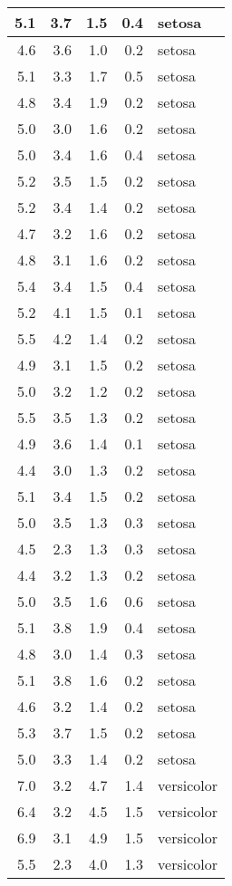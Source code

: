 \documentclass[a4paper, 10pt]{article}\usepackage[]{graphicx}\usepackage[]{color}
\begin{document}
\begin{longtable}{r|r|r|r|l}
5.1 & 3.7 & 1.5 & 0.4 & setosa\\
\hline
4.6 & 3.6 & 1.0 & 0.2 & setosa\\
\hline
5.1 & 3.3 & 1.7 & 0.5 & setosa\\
\hline
4.8 & 3.4 & 1.9 & 0.2 & setosa\\
\hline
5.0 & 3.0 & 1.6 & 0.2 & setosa\\
\hline
5.0 & 3.4 & 1.6 & 0.4 & setosa\\
\hline
5.2 & 3.5 & 1.5 & 0.2 & setosa\\
\hline
5.2 & 3.4 & 1.4 & 0.2 & setosa\\
\hline
4.7 & 3.2 & 1.6 & 0.2 & setosa\\
\hline
4.8 & 3.1 & 1.6 & 0.2 & setosa\\
\hline
5.4 & 3.4 & 1.5 & 0.4 & setosa\\
\hline
5.2 & 4.1 & 1.5 & 0.1 & setosa\\
\hline
5.5 & 4.2 & 1.4 & 0.2 & setosa\\
\hline
4.9 & 3.1 & 1.5 & 0.2 & setosa\\
\hline
5.0 & 3.2 & 1.2 & 0.2 & setosa\\
\hline
5.5 & 3.5 & 1.3 & 0.2 & setosa\\
\hline
4.9 & 3.6 & 1.4 & 0.1 & setosa\\
\hline
4.4 & 3.0 & 1.3 & 0.2 & setosa\\
\hline
5.1 & 3.4 & 1.5 & 0.2 & setosa\\
\hline
5.0 & 3.5 & 1.3 & 0.3 & setosa\\
\hline
4.5 & 2.3 & 1.3 & 0.3 & setosa\\
\hline
4.4 & 3.2 & 1.3 & 0.2 & setosa\\
\hline
5.0 & 3.5 & 1.6 & 0.6 & setosa\\
\hline
5.1 & 3.8 & 1.9 & 0.4 & setosa\\
\hline
4.8 & 3.0 & 1.4 & 0.3 & setosa\\
\hline
5.1 & 3.8 & 1.6 & 0.2 & setosa\\
\hline
4.6 & 3.2 & 1.4 & 0.2 & setosa\\
\hline
5.3 & 3.7 & 1.5 & 0.2 & setosa\\
\hline
5.0 & 3.3 & 1.4 & 0.2 & setosa\\
\hline
7.0 & 3.2 & 4.7 & 1.4 & versicolor\\
\hline
6.4 & 3.2 & 4.5 & 1.5 & versicolor\\
\hline
6.9 & 3.1 & 4.9 & 1.5 & versicolor\\
\hline
5.5 & 2.3 & 4.0 & 1.3 & versicolor\\

\end{longtable}
\end{document}

